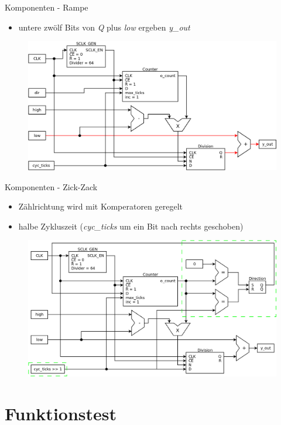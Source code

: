 \documentclass[11pt]{beamer}
\begin{document}
\begin{frame}{Komponenten - Rampe}
  \begin{itemize}
    \item untere zwölf Bits von \emph{Q} plus \emph{low} ergeben \emph{y\_out}
  \end{itemize}
  \begin{figure}
    \includegraphics[scale=0.28]{ramp_step3}
  \end{figure}
\end{frame}

\begin{frame}{Komponenten - Zick-Zack}
  \begin{itemize}
    \item Zählrichtung wird mit Komperatoren geregelt
    \item halbe Zykluszeit (\emph{cyc\_ticks} um ein Bit nach rechts geschoben)
  \end{itemize}
  \begin{figure}
    \includegraphics[scale=0.28]{zigzag}
  \end{figure}
\end{frame}

\section{Funktionstest}
\end{document}
